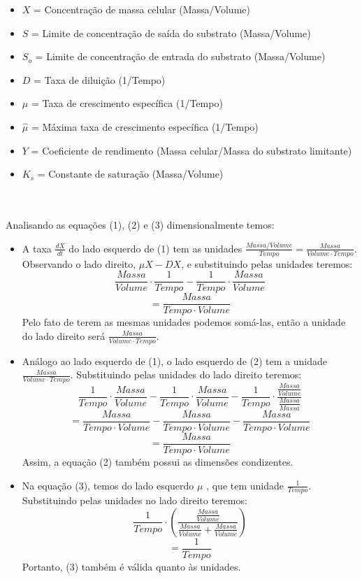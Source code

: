 \documentclass{article}
\begin{document}
\begin{itemize}
\item $X$ = Concentração de massa celular (Massa/Volume)
\item $S$ = Limite de concentração de saída do substrato (Massa/Volume)
\item $S_o$ = Limite de concentração de entrada do substrato (Massa/Volume)
\item $D$ = Taxa de diluição (1/Tempo)
\item $\mu$ = Taxa de crescimento específica (1/Tempo)
\item $\hat{\mu}$ = Máxima taxa de crescimento específica (1/Tempo)
\item $Y$ = Coeficiente de rendimento (Massa celular/Massa do substrato limitante)
\item $K_s$ = Constante de saturação (Massa/Volume)
\end{itemize}
\\\\Analisando as equações (1), (2) e (3) dimensionalmente temos:
\begin{itemize}
    \item A taxa $\frac{dX}{dt}$ do lado esquerdo de (1) tem as unidades $\frac{Massa/Volume}{Tempo} = \frac{Massa}{Volume \cdot Tempo}$. Observando o lado direito, $\mu X - DX$, e substituindo pelas unidades teremos: 
    $$\frac{Massa}{Volume} \cdot \frac{1}{Tempo} - \frac{1}{Tempo} \cdot \frac{Massa}{Volume}$$
    $$= \frac{Massa}{Tempo \cdot Volume}$$
    Pelo fato de terem as mesmas unidades podemos somá-las, então a unidade do lado direito será $\frac{Massa}{Volume \cdot Tempo}$.
    \item Análogo ao lado esquerdo de (1), o lado esquerdo de (2) tem a unidade $\frac{Massa}{Volume \cdot Tempo}$. Substituindo pelas unidades do lado direito teremos:
    $$\frac{1}{Tempo} \cdot \frac{Massa}{Volume} - \frac{1}{Tempo} \cdot \frac{Massa}{Volume} - \frac{1}{Tempo} \cdot \frac{\frac{Massa}{Volume}}{\frac{Massa}{Massa}} $$
    $$= \frac{Massa}{Tempo \cdot Volume} - \frac{Massa}{Tempo \cdot Volume} - \frac{Massa}{Tempo \cdot Volume}$$
    $$= \frac{Massa}{Tempo \cdot Volume} $$
    Assim, a equação (2) também possui as dimensões condizentes.
    \item Na equação (3), temos do lado esquerdo $\mu$ ,  que tem unidade $\frac{1}{Tempo}$. Substituindo pelas unidades no lado direito teremos:
    $$\frac{1}{Tempo} \cdot \left(\frac{\frac{Massa}{Volume}}{\frac{Massa}{Volume} + \frac{Massa}{Volume}}\right)$$
    $$= \frac{1}{Tempo}$$
    Portanto, (3) também é válida quanto às unidades.
    
\end{itemize}
\end{document}
